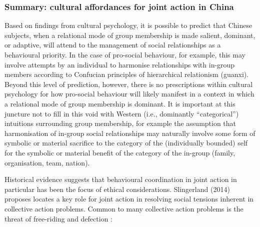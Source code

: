 \begin{CJK}{UTF8}{gbsn}


\subsubsection{Summary: cultural affordances for joint action in China}


Based on findings from cultural psychology, it is possible to predict that Chinese subjects, when a relational mode of group membership is made salient, dominant, or adaptive, will attend to the management of social relationships as a behavioural priority.  In the case of pro-social behaviour, for example, this may involve attempts by an individual to harmonise relationships with in-group members according to Confucian principles of hierarchical relationism (guanxi).  Beyond this level of prediction, however, there is no prescriptions within cultural psychology for how pro-social behaviour will likely manifest in a context in which a relational mode of group membership is dominant.  It is important at this juncture not to fill in this void with Western (i.e., dominantly ``categorical'') intuitions surrounding group membership, for example the assumption that harmonisation of in-group social relationships may naturally involve some form of symbolic or material sacrifice to the category of the (individually bounded) self for the symbolic or material benefit of the category of the in-group (family, organisation, team, nation).






Historical evidence suggests that behavioural coordination in joint action in particular has been the focus of ethical considerations.  Slingerland (2014) proposes locates a key role for joint action in resolving social tensions inherent in collective action problems.  Common to many collective action problems is the threat of free-riding and defection \citep{Cosmides2013}:


\end{CJK}
